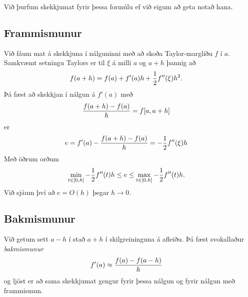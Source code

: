 \documentclass[letterpaper,10pt,icelandic]{sphinxmanual}
\begin{document}
Við þurfum skekkjumat fyrir þessa formúlu ef við eigum að geta notað
hana.


\subsection{Frammismunur}
\label{kafli04:frammismunur}
Við fáum mat á skekkjuna í nálguninni með að skoða Taylor-margliðu
\(f\) í \(a\). Samkvæmt setningu Taylors er til \(\xi\) á
milli \(a\) og \(a+h\) þannig að
\begin{gather}
\begin{split}f(a+h) = f(a) + f'(a)h + \frac{1}{2} f''(\xi)h^2.\end{split}\notag
\end{gather}
Þá fæst að skekkjan í nálgun á \(f'(a)\) með
\begin{gather}
\begin{split}\frac{f(a+h)-f(a)}{h} = f[a,a+h]\end{split}\notag
\end{gather}
er
\begin{gather}
\begin{split}e = f'(a) - \frac{f(a+h)-f(a)}{h} = -\frac{1}{2} f''(\xi) h\end{split}\notag
\end{gather}
Með öðrum orðum
\begin{gather}
\begin{split}\min_{t\in [0,h]} -\frac 12 f''(t)h \leq e \leq
\max_{t\in [0,h]} -\frac 12 f''(t)h.\end{split}\notag
\end{gather}
Við sjáum því að \(e=O(h)\) þegar \(h \to 0\).


\subsection{Bakmismunur}
\label{kafli04:bakmismunur}\label{kafli04:index-2}
Við getum sett \(a-h\) í stað \(a+h\) í skilgreininguna á
afleiðu. Þá fæst svokallaður \emph{bakmismunur}
\begin{gather}
\begin{split}f'(a) \approx \frac{f(a)-f(a-h)}{h}\end{split}\notag
\end{gather}
og ljóst er að sama skekkjumat gengur fyrir þessa nálgun og fyrir nálgun
með frammismun.

\end{document}
